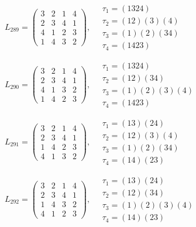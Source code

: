 $L_{289} = \begin{pmatrix} 3 & 2 & 1 & 4 \\ 2 & 3 & 4 & 1 \\ 4 & 1 & 2 & 3 \\ 1 & 4 & 3 & 2 \end{pmatrix}, \quad \begin{matrix} \tau_{1} = (1 3 2 4) \\ \tau_{2} = (1 2)(3)(4) \\ \tau_{3} = (1)(2)(3 4) \\ \tau_{4} = (1 4 2 3) \end{matrix}$

$L_{290} = \begin{pmatrix} 3 & 2 & 1 & 4 \\ 2 & 3 & 4 & 1 \\ 4 & 1 & 3 & 2 \\ 1 & 4 & 2 & 3 \end{pmatrix}, \quad \begin{matrix} \tau_{1} = (1 3 2 4) \\ \tau_{2} = (1 2)(3 4) \\ \tau_{3} = (1)(2)(3)(4) \\ \tau_{4} = (1 4 2 3) \end{matrix}$

$L_{291} = \begin{pmatrix} 3 & 2 & 1 & 4 \\ 2 & 3 & 4 & 1 \\ 1 & 4 & 2 & 3 \\ 4 & 1 & 3 & 2 \end{pmatrix}, \quad \begin{matrix} \tau_{1} = (1 3)(2 4) \\ \tau_{2} = (1 2)(3)(4) \\ \tau_{3} = (1)(2)(3 4) \\ \tau_{4} = (1 4)(2 3) \end{matrix}$

$L_{292} = \begin{pmatrix} 3 & 2 & 1 & 4 \\ 2 & 3 & 4 & 1 \\ 1 & 4 & 3 & 2 \\ 4 & 1 & 2 & 3 \end{pmatrix}, \quad \begin{matrix} \tau_{1} = (1 3)(2 4) \\ \tau_{2} = (1 2)(3 4) \\ \tau_{3} = (1)(2)(3)(4) \\ \tau_{4} = (1 4)(2 3) \end{matrix}$

